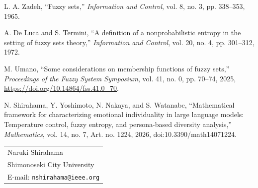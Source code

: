 \documentclass[a4paper,10pt,twocolumn]{myjarticle2}
\begin{document}
\vspace{1mm}
\par\noindent
[1] L. A. Zadeh, ``Fuzzy sets,'' \emph{Information and Control}, vol. 8,
no. 3, pp. 338--353, 1965.
\par\noindent
[2] A. De Luca and S. Termini, ``A definition of a nonprobabilistic entropy in
the setting of fuzzy sets theory,'' \emph{Information and Control}, vol. 20,
no. 4, pp. 301--312, 1972.
\par\noindent
[3] M. Umano, ``Some considerations on membership functions of fuzzy sets,''
\emph{Proceedings of the Fuzzy System Symposium}, vol. 41, no. 0, pp. 70--74,
2025, \url{https://doi.org/10.14864/fss.41.0_70}.
\par\noindent
[4] N. Shirahama, Y. Yoshimoto, N. Nakaya, and S. Watanabe, ``Mathematical
framework for characterizing emotional individuality in large language models:
Temperature control, fuzzy entropy, and persona-based diversity analysis,''
\emph{Mathematics}, vol. 14, no. 7, Art. no. 1224, 2026,
doi:10.3390/math14071224.

\vspace{1mm}
\par\noindent
\begin{tabular}{l}
Naruki Shirahama \\
Shimonoseki City University\\
E-mail: {\tt  nshirahama@ieee.org}
\end{tabular}
\end{document}
